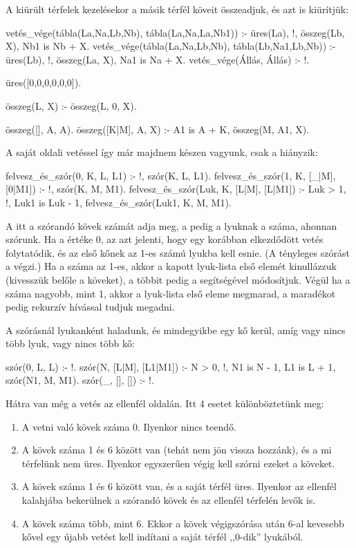 A kiürült térfelek kezelésekor a másik térfél köveit
összeadjuk, és azt is kiürítjük:
\begin{program}
vetés_vége(tábla(La,Na,Lb,Nb),
           tábla(La,Na,La,Nb1)) :-
    üres(La), !, összeg(Lb, X), Nb1 is Nb + X.
vetés_vége(tábla(La,Na,Lb,Nb),
           tábla(Lb,Na1,Lb,Nb)) :-
    üres(Lb), !, összeg(La, X), Na1 is Na + X.
vetés_vége(Állás, Állás) :- !.

üres([0,0,0,0,0,0]).

összeg(L, X) :- összeg(L, 0, X).

összeg([], A, A).
összeg([K|M], A, X) :-
    A1 is A + K,
    összeg(M, A1, X).
\end{program}

A saját oldali vetéssel így már majdnem készen
vagyunk, csak a  hiányzik:
\begin{program}
felvesz_és_szór(0, K, L, L1) :- %
    !, szór(K, L, L1).
felvesz_és_szór(1, K, [_|M], [0|M1]) :-
    !, szór(K, M, M1).
felvesz_és_szór(Luk, K, [L|M], [L|M1]) :-
    Luk > 1, !, Luk1 is Luk - 1,
    felvesz_és_szór(Luk1, K, M, M1).
\end{program}

A  itt a szórandó kövek számát adja meg, a
 pedig a lyuknak a száma, ahonnan
szórunk. Ha a  értéke 0, az azt jelenti,
hogy egy korábban elkezdődött vetés folytatódik, és
az első kőnek az 1-es számú lyukba kell esnie. (A
tényleges szórást a  végzi.) Ha a 
száma az 1-es, akkor a kapott lyuk-lista első elemét
kinullázzuk (kivesszük belőle a köveket), a többit
pedig a  segítségével módosítjuk. Végül ha
a  száma nagyobb, mint 1, akkor a lyuk-lista
első eleme megmarad, a maradékot pedig rekurzív
hívással tudjuk megadni.

A szórásnál lyukanként haladunk, és mindegyikbe egy
kő kerül, amíg vagy nincs több lyuk, vagy nincs több kő:
\begin{program}
szór(0, L, L) :- !.
szór(N, [L|M], [L1|M1]) :-
    N > 0, !,
    N1 is N - 1, L1 is L + 1,
    szór(N1, M, M1).
szór(_, [], []) :- !.
\end{program}

Hátra van még a vetés az ellenfél oldalán. Itt 4
esetet különböztetünk meg:
\begin{enumerate}
\item A vetni való kövek száma 0. Ilyenkor nincs
  teendő.
\item A kövek száma 1 és 6 között van (tehát nem jön
  vissza hozzánk), és a mi térfelünk nem
  üres. Ilyenkor egyszerűen végig kell szórni ezeket
  a köveket.
\item A kövek száma 1 és 6 között van, és a saját
  térfél üres. Ilyenkor az ellenfél kalahjába
  bekerülnek a szórandó kövek és az ellenfél
  térfelén levők is.
\item A kövek száma több, mint 6. Ekkor a kövek
  végigszórása után 6-al kevesebb kővel egy újabb
  vetést kell indítani a saját térfél ,,0-dik''
  lyukából.
\end{enumerate}

